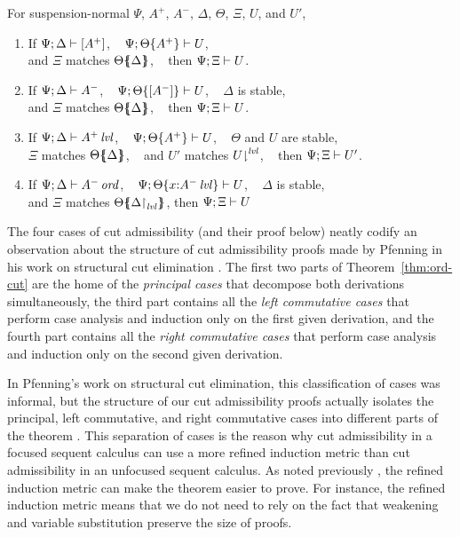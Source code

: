 \begin{theorem}\label{thm:ord-cut}
For suspension-normal $\Psi$, $A^+$, $A^-$, $\Delta$, $\Theta$, $\Xi$, $U$, and $U'$,
\begin{enumerate}
\item If ${\Psi};{\Delta} \vdash {[ A^+ ]}$, ~
         ${\Psi};{{\Theta}\{{A^+}\}} \vdash {U}$,\\
      and $\Xi$ matches ${\Theta}\mbox{$\{\hspace{-4pt}\{$}{{\Delta}}\mbox{$\}\hspace{-4pt}\}$}$, ~
      then ${\Psi};{\Xi} \vdash {U}$.
\item If ${\Psi};{\Delta} \vdash {A^-}$, ~
         ${\Psi};{{\Theta}\{{[A^-]}\}} \vdash {U}$, ~
         $\Delta$ is stable, \\
      and $\Xi$ matches ${\Theta}\mbox{$\{\hspace{-4pt}\{$}{\Delta}\mbox{$\}\hspace{-4pt}\}$}$, ~
      then ${\Psi};{\Xi} \vdash {U}$.
\item If ${\Psi};{\Delta} \vdash {{A^+}\,{{\it lvl}}}$, ~
         ${\Psi};{{\Theta}\{{A^+}\}} \vdash {U}$, ~
         $\Theta$ and $U$ are stable, \\ 
      $\Xi$ matches ${\Theta}\mbox{$\{\hspace{-4pt}\{$}{\Delta}\mbox{$\}\hspace{-4pt}\}$}$, ~
      and $U'$ matches ${U}{\downharpoonright}^{{\it lvl}}$, ~
      then ${\Psi};{\Xi} \vdash {U'}$.
\item If ${\Psi};{\Delta} \vdash {{A^-}\,{{\it ord}}}$, ~
         ${\Psi};{{\Theta}\{{x{:}{A^-}\,{{\it lvl}}}\}} \vdash {U}$, ~
         $\Delta$ is stable, \\ 
      and $\Xi$ matches ${\Theta}\mbox{$\{\hspace{-4pt}\{$}{\ensuremath{{\Delta}{\upharpoonright}_{{\it lvl}}}}\mbox{$\}\hspace{-4pt}\}$}$,
      then ${\Psi};{\Xi} \vdash {U}$
\end{enumerate}
\end{theorem}
\medskip

\noindent
The four cases of cut admissibility (and their proof below) neatly
codify an observation about the structure of cut admissibility proofs
made by Pfenning in his work on structural cut elimination
\cite{pfenning00structural}.  The first two parts of
Theorem~\ref{thm:ord-cut} are the home of the {\it principal cases}
that decompose both derivations simultaneously, the third part
contains all the {\it left commutative cases} that perform case
analysis and induction only on the first given derivation, and the
fourth part contains all the {\it right commutative cases} that
perform case analysis and induction only on the second given
derivation.

In Pfenning's work on structural cut elimination, this classification
of cases was informal, but the structure of our cut admissibility
proofs actually isolates the principal, left commutative, and right
commutative cases into different parts of the theorem
\cite{pfenning00structural}. This separation of cases is the reason
why cut admissibility in a focused sequent calculus can use a more
refined induction metric than cut admissibility in an unfocused
sequent calculus. As noted previously \cite{simmons11structural}, the
refined induction metric can make the theorem easier to prove.  For
instance, the refined induction metric means that we do not need to
rely on the fact that weakening and variable substitution preserve
the size of proofs.

